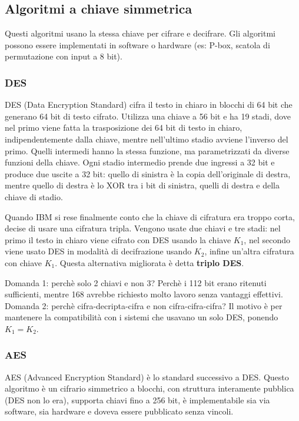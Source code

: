 \subsection{Algoritmi a chiave simmetrica} %
Questi algoritmi usano la stessa chiave per cifrare e decifrare.
Gli algoritmi possono essere implementati in software o hardware (es: P-box, scatola di permutazione con input a 8 bit).

\subsubsection{DES}
DES (Data Encryption Standard) cifra il testo in chiaro in blocchi di 64 bit che generano 64 bit di testo cifrato.
Utilizza una chiave a 56 bit e ha 19 stadi, dove nel primo viene fatta la trasposizione dei 64 bit di testo in chiaro,
indipendentemente dalla chiave, mentre nell'ultimo stadio avviene l'inverso del primo. 
Quelli intermedi hanno la stessa funzione, ma parametrizzati da diverse funzioni della chiave.
Ogni stadio intermedio prende due ingressi a 32 bit e produce due uscite a 32 bit:
quello di sinistra è la copia dell'originale di destra, mentre quello di destra è lo XOR tra i bit di sinistra, quelli di destra e della chiave di stadio.

Quando IBM si rese finalmente conto che la chiave di cifratura era troppo corta, decise di usare una cifratura tripla.
Vengono usate due chiavi e tre stadi: nel primo il testo in chiaro viene cifrato con DES usando la chiave $K_1$, nel secondo viene usato DES in modalità di decifrazione usando $K_2$, infine un'altra cifratura con chiave $K_1$.
Questa alternativa migliorata è detta \textbf{triplo DES}.

Domanda 1: perchè solo 2 chiavi e non 3? Perchè i 112 bit erano ritenuti sufficienti, mentre 168 avrebbe richiesto molto lavoro senza vantaggi effettivi.\\
Domanda 2: perchè cifra-decripta-cifra e non cifra-cifra-cifra? Il motivo è per mantenere la compatibilità con i sistemi che usavano un solo DES, ponendo $K_1=K_2$.

\subsubsection{AES}
AES (Advanced Encryption Standard) è lo standard successivo a DES.
Questo algoritmo è un cifrario simmetrico a blocchi, con struttura interamente pubblica (DES non lo era), supporta chiavi fino a 256 bit, è implementabile sia via software, sia hardware e doveva essere pubblicato senza vincoli.

